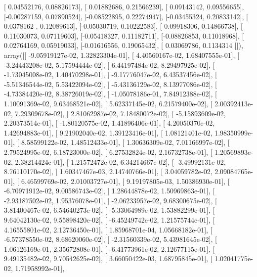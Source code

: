 \documentclass{article}
\begin{document}
       [ 0.04552176,  0.08826173],
       [ 0.01882686,  0.21566239],
       [ 0.09143142,  0.09556655],
       [-0.00287159,  0.07890524],
       [-0.08522895,  0.22274947],
       [-0.03455324,  0.20833142],
       [ 0.0378162 ,  0.12089613],
       [-0.05030719,  0.10222583],
       [ 0.09918306,  0.14866738],
       [ 0.11030073,  0.07119603],
       [-0.05418327,  0.11182711],
       [-0.08826853,  0.11018968],
       [ 0.02764169,  0.05919033],
       [-0.01616556,  0.19065432],
       [ 0.03069786,  0.1134314 ]]), array([[ -9.05919127e-02,   1.32823304e-01],
       [  4.40560167e-02,   1.68407555e-01],
       [ -3.24443208e-02,   5.17594444e-02],
       [  6.44197484e-02,   8.29497925e-02],
       [ -1.73045008e-02,   1.40470298e-01],
       [ -9.17776047e-02,   6.43537456e-02],
       [ -5.51346544e-02,   5.53422094e-02],
       [ -5.43136129e-02,   8.13977086e-02],
       [ -4.73384420e-02,   8.38726019e-02],
       [ -1.05078186e-01,   7.84912388e-02],
       [  1.10091369e-02,   9.63468521e-02],
       [  5.62337145e-02,   6.21579400e-02],
       [  2.00392413e-02,   7.29309678e-02],
       [  2.81062987e-02,   7.18480072e-02],
       [ -5.15893609e-02,   2.20373514e-01],
       [ -1.80120575e-02,   1.41896406e-01],
       [  4.20050370e-02,   1.42694883e-01],
       [  9.21902040e-02,   1.39123416e-01],
       [  1.08121401e-02,   1.98350999e-01],
       [  8.58599122e-02,   1.48512433e-01],
       [  1.30636309e-02,   7.01166997e-02],
       [  2.79524995e-02,   6.18723000e-02],
       [  6.27532824e-02,   2.16732738e-01],
       [  1.20569893e-02,   2.38214424e-01],
       [  1.21572472e-02,   6.34214667e-02],
       [ -3.49992131e-02,   8.76110170e-02],
       [  1.60347467e-03,   2.14740766e-01],
       [  3.04059782e-02,   2.09084765e-01],
       [  6.46599769e-02,   2.01003727e-01],
       [  9.19197805e-03,   1.50386930e-01],
       [ -6.70971912e-02,   9.00586743e-02],
       [  1.28644878e-02,   1.50969863e-01],
       [ -2.93187502e-02,   1.95376078e-01],
       [ -2.06233957e-02,   9.68300675e-02],
       [  3.81400467e-02,   6.54640273e-02],
       [ -5.33064989e-02,   1.53882299e-01],
       [  9.64042130e-02,   9.55898420e-02],
       [ -6.45249742e-02,   1.21575744e-01],
       [  4.16555801e-02,   2.12736450e-01],
       [  1.85968701e-04,   1.05668182e-01],
       [ -6.57378550e-02,   8.68620060e-02],
       [ -2.31560339e-02,   5.43981645e-02],
       [  1.06126169e-01,   2.35672808e-01],
       [ -6.41773961e-02,   2.12677115e-01],
       [  9.49135482e-02,   9.70542625e-02],
       [  3.66050422e-03,   1.68795845e-01],
       [  1.02041775e-02,   1.71958992e-01],
\end{document}
